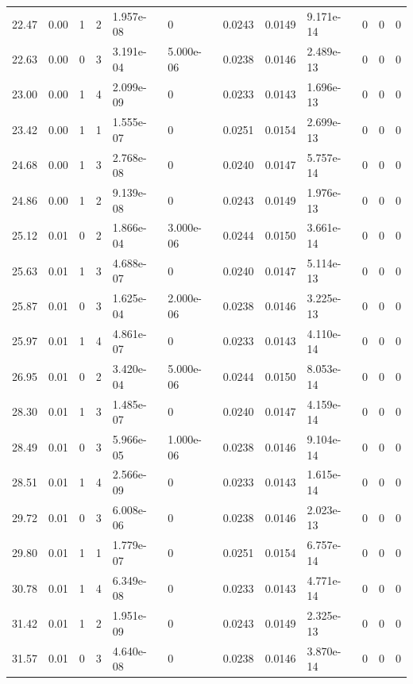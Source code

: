 \documentclass[preview]{standalone}
\begin{document}
{{{\begin{tabular}{L{1.2cm}C{1.2cm} C{0.3cm}C{0.5cm} C{1.4cm}C{1.4cm} C{1.4cm}C{1.4cm} C{1.6cm}C{1.6cm} C{1.6cm}C{1.6cm}}
  22.47  &  0.00  & 1     &  2 &  1.957e-08  & 0  &  0.0243&   0.0149& 9.171e-14 & 0   &  0 & 0  \\ 
  22.63  &  0.00  & 0     &  3 &  3.191e-04  & 5.000e-06  &  0.0238&   0.0146& 2.489e-13 & 0   &  0 & 0  \\ 
  23.00  &  0.00  & 1     &  4 &  2.099e-09  & 0  &  0.0233&   0.0143& 1.696e-13 & 0   &  0 & 0  \\ 
  23.42  &  0.00  & 1     &  1 &  1.555e-07  & 0  &  0.0251&   0.0154& 2.699e-13 & 0   &  0 & 0  \\ 
  24.68  &  0.00  & 1     &  3 &  2.768e-08  & 0  &  0.0240&   0.0147& 5.757e-14 & 0   &  0 & 0  \\ 
  24.86  &  0.00  & 1     &  2 &  9.139e-08  & 0  &  0.0243&   0.0149& 1.976e-13 & 0   &  0 & 0  \\ 
  25.12  &  0.01  & 0     &  2 &  1.866e-04  & 3.000e-06  &  0.0244&   0.0150& 3.661e-14 & 0   &  0 & 0  \\ 
  25.63  &  0.01  & 1     &  3 &  4.688e-07  & 0  &  0.0240&   0.0147& 5.114e-13 & 0   &  0 & 0  \\ 
  25.87  &  0.01  & 0     &  3 &  1.625e-04  & 2.000e-06  &  0.0238&   0.0146& 3.225e-13 & 0   &  0 & 0  \\ 
  25.97  &  0.01  & 1     &  4 &  4.861e-07  & 0  &  0.0233&   0.0143& 4.110e-14 & 0   &  0 & 0  \\ 
  26.95  &  0.01  & 0     &  2 &  3.420e-04  & 5.000e-06  &  0.0244&   0.0150& 8.053e-14 & 0   &  0 & 0  \\ 
  28.30  &  0.01  & 1     &  3 &  1.485e-07  & 0  &  0.0240&   0.0147& 4.159e-14 & 0   &  0 & 0  \\ 
  28.49  &  0.01  & 0     &  3 &  5.966e-05  & 1.000e-06  &  0.0238&   0.0146& 9.104e-14 & 0   &  0 & 0  \\ 
  28.51  &  0.01  & 1     &  4 &  2.566e-09  & 0  &  0.0233&   0.0143& 1.615e-14 & 0   &  0 & 0  \\ 
  29.72  &  0.01  & 0     &  3 &  6.008e-06  & 0  &  0.0238&   0.0146& 2.023e-13 & 0   &  0 & 0  \\ 
  29.80  &  0.01  & 1     &  1 &  1.779e-07  & 0  &  0.0251&   0.0154& 6.757e-14 & 0   &  0 & 0  \\ 
  30.78  &  0.01  & 1     &  4 &  6.349e-08  & 0  &  0.0233&   0.0143& 4.771e-14 & 0   &  0 & 0  \\ 
  31.42  &  0.01  & 1     &  2 &  1.951e-09  & 0  &  0.0243&   0.0149& 2.325e-13 & 0   &  0 & 0  \\ 
  31.57  &  0.01  & 0     &  3 &  4.640e-08  & 0  &  0.0238&   0.0146& 3.870e-14 & 0   &  0 & 0  \\ 

\end{tabular}}}}
\end{document}
